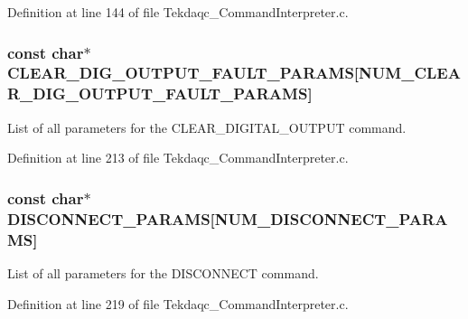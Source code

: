 Definition at line 144 of file Tekdaqc\-\_\-\-Command\-Interpreter.\-c.

\hypertarget{group__command__interpreter_gae3e466b9002fbb2a3b72a14091736c14}{
\subsubsection[{C\-L\-E\-A\-R\-\_\-\-D\-I\-G\-\_\-\-O\-U\-T\-P\-U\-T\-\_\-\-F\-A\-U\-L\-T\-\_\-\-P\-A\-R\-A\-M\-S}]{\setlength{\rightskip}{0pt plus 5cm}const char$\ast$ C\-L\-E\-A\-R\-\_\-\-D\-I\-G\-\_\-\-O\-U\-T\-P\-U\-T\-\_\-\-F\-A\-U\-L\-T\-\_\-\-P\-A\-R\-A\-M\-S\mbox{[}{\bf N\-U\-M\-\_\-\-C\-L\-E\-A\-R\-\_\-\-D\-I\-G\-\_\-\-O\-U\-T\-P\-U\-T\-\_\-\-F\-A\-U\-L\-T\-\_\-\-P\-A\-R\-A\-M\-S}\mbox{]}}}\label{group__command__interpreter_gae3e466b9002fbb2a3b72a14091736c14}
List of all parameters for the C\-L\-E\-A\-R\-\_\-\-D\-I\-G\-I\-T\-A\-L\-\_\-\-O\-U\-T\-P\-U\-T command. 

Definition at line 213 of file Tekdaqc\-\_\-\-Command\-Interpreter.\-c.

\hypertarget{group__command__interpreter_ga4c2b766d3384cd7cb0ed759dab8fc4ac}{
\subsubsection[{D\-I\-S\-C\-O\-N\-N\-E\-C\-T\-\_\-\-P\-A\-R\-A\-M\-S}]{\setlength{\rightskip}{0pt plus 5cm}const char$\ast$ D\-I\-S\-C\-O\-N\-N\-E\-C\-T\-\_\-\-P\-A\-R\-A\-M\-S\mbox{[}{\bf N\-U\-M\-\_\-\-D\-I\-S\-C\-O\-N\-N\-E\-C\-T\-\_\-\-P\-A\-R\-A\-M\-S}\mbox{]}}}\label{group__command__interpreter_ga4c2b766d3384cd7cb0ed759dab8fc4ac}
List of all parameters for the D\-I\-S\-C\-O\-N\-N\-E\-C\-T command. 

Definition at line 219 of file Tekdaqc\-\_\-\-Command\-Interpreter.\-c.

